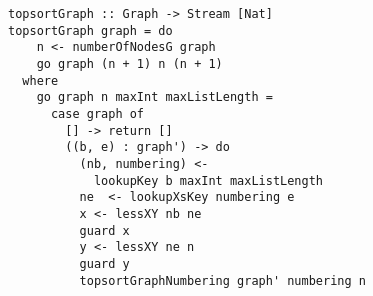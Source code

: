 \begin{figure}[!t]
  \centering
  \begin{minipage}{0.49\textwidth}
    \begin{lstlisting}[label={topsort_graph}, caption={Functional implementation for a \lstinline{topsortoTrue in out} direction}, captionpos=b, frame=tb]
topsortGraph :: Graph -> Stream [Nat]
topsortGraph graph = do
    n <- numberOfNodesG graph
    go graph (n + 1) n (n + 1)
  where
    go graph n maxInt maxListLength =
      case graph of
        [] -> return []
        ((b, e) : graph') -> do
          (nb, numbering) <-
            lookupKey b maxInt maxListLength
          ne  <- lookupXsKey numbering e
          x <- lessXY nb ne
          guard x
          y <- lessXY ne n
          guard y
          topsortGraphNumbering graph' numbering n
    \end{lstlisting}
  \end{minipage}
\end{figure}

